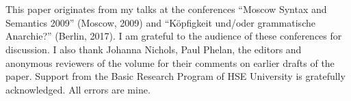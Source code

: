 \documentclass[output=paper,nobabel,draftmode  ,colorlinks, citecolor=brown]{langscibook}
\begin{document}
\section*{\acknowledgmentsUS}

This paper originates from my talks at the conferences ``Moscow Syntax and Semantics 2009'' (Moscow, 2009) and ``Köpfigkeit und/oder grammatische Anarchie?'' (Berlin, 2017). I am grateful to the audience of these conferences for discussion. I also thank Johanna Nichols, Paul Phelan, the editors and anonymous reviewers of the volume for their comments on earlier drafts of the paper. Support from the Basic Research Program of HSE University is gratefully acknowledged. All errors are mine.

{\sloppy
\printbibliography[heading=subbibliography,notkeyword=this]
}
\end{document}
